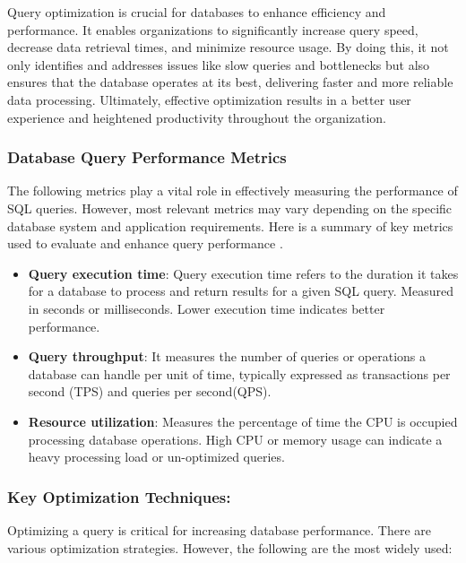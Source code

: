 Query optimization is crucial for databases to enhance efficiency and performance. It enables organizations to significantly increase query speed, decrease data retrieval times, and minimize resource usage. By doing this, it not only identifies and addresses issues like slow queries and bottlenecks but also ensures that the database operates at its best, delivering faster and more reliable data processing. Ultimately, effective optimization results in a better user experience and heightened productivity throughout the organization\cite{team-2023, r-2024}.


\subsubsection{Database Query Performance Metrics}
The following metrics play a vital role in effectively measuring the performance of SQL queries. However, most relevant metrics may vary depending on the specific database system and application requirements.
Here is a summary of key metrics used to evaluate and enhance query performance \cite{chwesewicz-2024}.
\begin{itemize}
    \item\textbf{Query execution time}: Query execution time refers to the duration it takes for a database to process and return results for a given SQL query. Measured in seconds or milliseconds. Lower execution time indicates better performance.
    \item\textbf{Query throughput}: It measures the number of queries or operations a database can handle per unit of time, typically expressed as transactions per second (TPS) and queries per second(QPS).
    \item\textbf{Resource utilization}: Measures the percentage of time the CPU is occupied processing database operations. High CPU or memory usage can indicate a heavy processing load or un-optimized queries.
\end{itemize}

\subsubsection{Key Optimization Techniques:}

Optimizing a query is critical for increasing database performance. There are various optimization strategies. However, the following are the most widely used:

